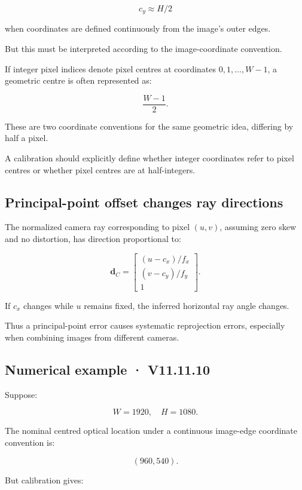 \[
 c_y\approx H/2
\]

when coordinates are defined continuously from the image's outer edges.

But this must be interpreted according to the image-coordinate convention.

If integer pixel indices denote pixel centres at coordinates \(0,1,\ldots,W-1\), a geometric centre is often represented as:

\[
 \frac{W-1}{2}.
\]

These are two coordinate conventions for the same geometric idea, differing by half a pixel.

A calibration should explicitly define whether integer coordinates refer to pixel centres or whether pixel centres are at half-integers.

\subsection{Principal-point offset changes ray directions}\label{02-foundations-ii-ch034-principal-point-offset-changes-ray-directions}

The normalized camera ray corresponding to pixel \((u,v)\), assuming zero skew and no distortion, has direction proportional to:

\[
 \boxed{ \mathbf d_C= \begin{bmatrix} (u-c_x)/f_x\\ (v-c_y)/f_y\\ 1 \end{bmatrix} }.
\]

If \(c_x\) changes while \(u\) remains fixed, the inferred horizontal ray angle changes.

Thus a principal-point error causes systematic reprojection errors, especially when combining images from different cameras.

\subsection{Numerical example · V11.11.10}\label{02-foundations-ii-ch034-numerical-example-v11.11.10}

Suppose:

\[
 W=1920,\quad H=1080.
\]

The nominal centred optical location under a continuous image-edge coordinate convention is:

\[
 (960,540).
\]

But calibration gives:

